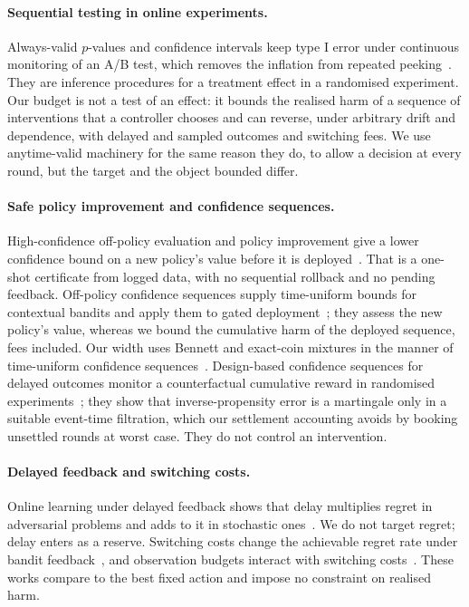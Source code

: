 \documentclass[10pt]{article}
\theoremstyle{plain}
\theoremstyle{definition}
\begin{document}
\paragraph{Sequential testing in online experiments.}
Always-valid $p$-values and confidence intervals keep type I error under continuous monitoring of an A/B test, which removes the inflation from repeated peeking~\citep{johari2017peeking,johari2022always}. They are inference procedures for a treatment effect in a randomised experiment. Our budget is not a test of an effect: it bounds the realised harm of a sequence of interventions that a controller chooses and can reverse, under arbitrary drift and dependence, with delayed and sampled outcomes and switching fees. We use anytime-valid machinery for the same reason they do, to allow a decision at every round, but the target and the object bounded differ.

\paragraph{Safe policy improvement and confidence sequences.}
High-confidence off-policy evaluation and policy improvement give a lower confidence bound on a new policy's value before it is deployed~\citep{thomas2015hcope,thomas2015hcpi}. That is a one-shot certificate from logged data, with no sequential rollback and no pending feedback. Off-policy confidence sequences supply time-uniform bounds for contextual bandits and apply them to gated deployment~\citep{karampatziakis2021offpolicy}; they assess the new policy's value, whereas we bound the cumulative harm of the deployed sequence, fees included. Our width uses Bennett and exact-coin mixtures in the manner of time-uniform confidence sequences~\citep{howard2021time,waudbysmith2024betting}. Design-based confidence sequences for delayed outcomes monitor a counterfactual cumulative reward in randomised experiments~\citep{lindon2026design}; they show that inverse-propensity error is a martingale only in a suitable event-time filtration, which our settlement accounting avoids by booking unsettled rounds at worst case. They do not control an intervention.

\paragraph{Delayed feedback and switching costs.}
Online learning under delayed feedback shows that delay multiplies regret in adversarial problems and adds to it in stochastic ones~\citep{joulani2013delayed}. We do not target regret; delay enters as a reserve. Switching costs change the achievable regret rate under bandit feedback~\citep{cesabianchi2013switching}, and observation budgets interact with switching costs~\citep{cheng2023feedback}. These works compare to the best fixed action and impose no constraint on realised harm.
\end{document}
